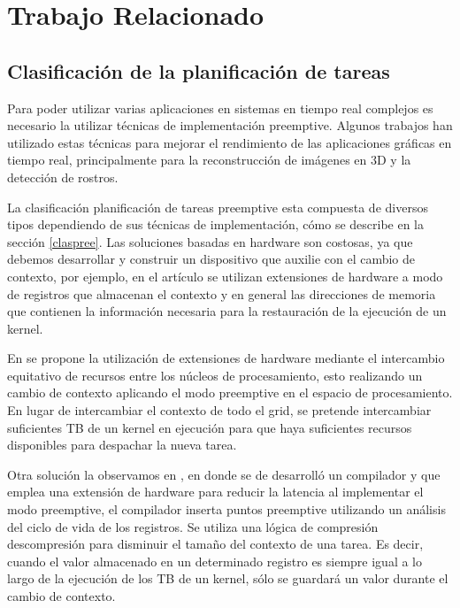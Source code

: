  \chapter{Trabajo Relacionado}
    \label{cha:TrabajoRelacionado}
\section{Clasificación de la planificación de tareas}
	
	Para poder utilizar varias aplicaciones en sistemas en tiempo real complejos es necesario la utilizar técnicas de implementación preemptive. Algunos trabajos han utilizado estas técnicas para mejorar el rendimiento de las aplicaciones gráficas en tiempo real, principalmente para la reconstrucción de imágenes en 3D y la detección de rostros.

\vspace{0.3cm}

La clasificación planificación de tareas preemptive esta compuesta de diversos tipos dependiendo de sus técnicas de implementación, cómo se describe en la sección \ref{claspree}. 
Las soluciones basadas en hardware son costosas, ya que debemos desarrollar y construir un dispositivo que auxilie con el cambio de contexto, por ejemplo, en el artículo \cite{18} se utilizan extensiones de hardware a modo de registros que almacenan el contexto y en general las direcciones de memoria que contienen la información necesaria para la restauración de la ejecución de un kernel. 

\vspace{0.3cm}

En \cite{20} se propone la utilización de extensiones de hardware mediante el intercambio equitativo de recursos entre los núcleos de procesamiento, esto realizando un cambio de contexto aplicando el modo preemptive en el espacio de procesamiento. En lugar de intercambiar el contexto de todo el grid, se pretende intercambiar suficientes TB de un kernel en ejecución para que haya suficientes recursos disponibles para despachar la nueva tarea. 

\vspace{0.3cm}

Otra solución la observamos en \cite{8}, en donde se de desarrolló un compilador y que emplea una extensión de hardware para reducir la latencia al implementar el modo preemptive, el compilador inserta puntos preemptive utilizando un análisis del ciclo de vida de los registros. Se utiliza una lógica de compresión descompresión para disminuir el tamaño del contexto de una tarea. Es decir, cuando el valor almacenado en un determinado registro es siempre igual a lo largo de la ejecución de los TB de un kernel, sólo se guardará un valor durante el cambio de contexto.


